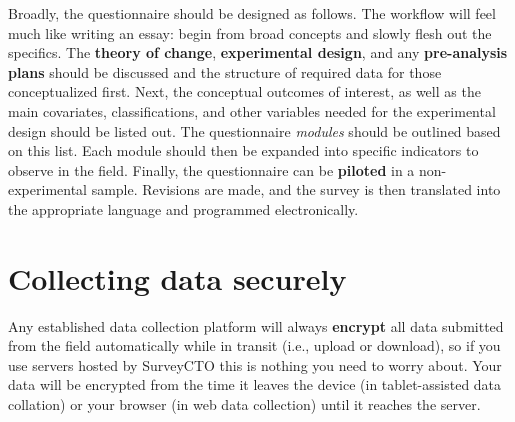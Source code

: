 Broadly, the questionnaire should be designed as follows.
The workflow will feel much like writing an essay:
begin from broad concepts and slowly flesh out the specifics.
The \textbf{theory of change}, \textbf{experimental design},
and any \textbf{pre-analysis plans} should be discussed
and the structure of required data for those conceptualized first.
Next, the conceptual outcomes of interest, as well as the main covariates, classifications,
and other variables needed for the experimental design should be listed out.
The questionnaire \textit{modules} should be outlined based on this list.
Each module should then be expanded into specific indicators to observe in the field.
Finally, the questionnaire can be \textbf{piloted}
in a non-experimental sample.
Revisions are made, and the survey is then translated into the appropriate language and programmed electronically.


\section{Collecting data securely}

Any established data collection platform will always \textbf{encrypt}
all data submitted from the field automatically while in transit
(i.e., upload or download), so if you use servers hosted by SurveyCTO
this is nothing you need to worry about.
Your data will be encrypted from the time it leaves the device
(in tablet-assisted data collation) or your browser (in web data collection)
until it reaches the server.


